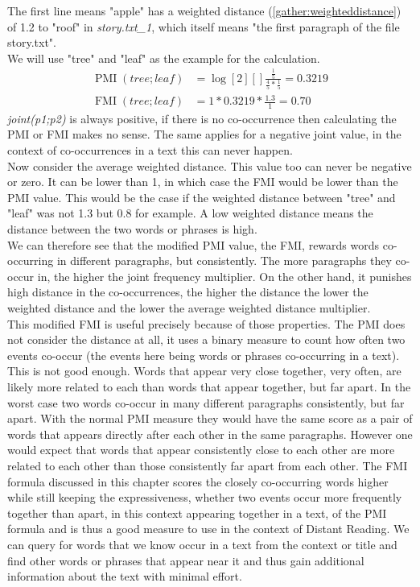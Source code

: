 The first line means "apple" has a weighted distance (\ref{gather:weighteddistance}) of 1.2 to "roof" in \textit{story.txt\_1}, which itself means "the first paragraph of the file story.txt".\\
We will use "tree" and "leaf" as the example for the calculation.\\
\begin{equation}\label{gather:fmiexample}
\begin{aligned}
\operatorname{PMI}(tree;leaf) &= \log[2][]{\frac{\frac{1}{5}}{\frac{4}{5} * \frac{1}{5}}} = 0.3219 \\
\operatorname {FMI}(tree;leaf) &= 1 * 0.3219 * \frac{1.3}{1} = 0.70
\end{aligned}
\end{equation}
\textit{joint(p1;p2)} is always positive, if there is no co-occurrence then calculating the PMI or FMI makes no sense. The same applies for a negative joint value, in the context of co-occurrences in a text this can never happen.\\
Now consider the average weighted distance. This value too can never be negative or zero. It can be lower than 1, in which case the FMI would be lower than the PMI value. This would be the case if the weighted distance between "tree" and "leaf" was not 1.3 but 0.8 for example. A low weighted distance means the distance between the two words or phrases is high.\\
We can therefore see that the modified PMI value, the FMI, rewards words co-occurring in different paragraphs, but consistently. The more paragraphs they co-occur in, the higher the joint frequency multiplier. On the other hand, it punishes high distance in the co-occurrences, the higher the distance the lower the weighted distance and the lower the average weighted distance multiplier.\\
This modified FMI is useful precisely because of those properties. The PMI does not consider the distance at all, it uses a binary measure to count how often two events co-occur (the events here being words or phrases co-occurring in a text). This is not good enough. Words that appear very close together, very often, are likely more related to each than words that appear together, but far apart. In the worst case two words co-occur in many different paragraphs consistently, but far apart. With the normal PMI measure they would have the same score as a pair of words that appears directly after each other in the same paragraphs. However one would expect that words that appear consistently close to each other are more related to each other than those consistently far apart from each other. The FMI formula discussed in this chapter scores the closely co-occurring words higher while still keeping the expressiveness, whether two events occur more frequently together than apart, in this context appearing together in a text, of the PMI formula and is thus a good measure to use in the context of Distant Reading. We can query for words that we know occur in a text from the context or title and find other words or phrases that appear near it and thus gain additional information about the text with minimal effort.

